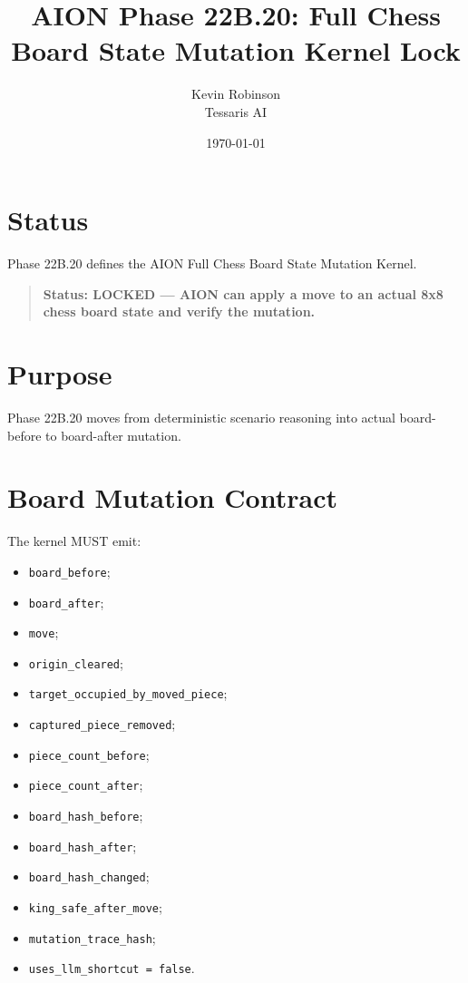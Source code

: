 \documentclass[11pt,a4paper]{article}
\title{\textbf{AION Phase 22B.20: Full Chess Board State Mutation Kernel Lock}}
\author{Kevin Robinson\\Tessaris AI}
\date{\today}
\begin{document}
\maketitle

\section{Status}

Phase 22B.20 defines the AION Full Chess Board State Mutation Kernel.

\begin{quote}
\textbf{Status: LOCKED --- AION can apply a move to an actual 8x8 chess board state and verify the mutation.}
\end{quote}

\section{Purpose}

Phase 22B.20 moves from deterministic scenario reasoning into actual board-before to board-after mutation.

\section{Board Mutation Contract}

The kernel MUST emit:

\begin{itemize}
  \item \texttt{board\_before};
  \item \texttt{board\_after};
  \item \texttt{move};
  \item \texttt{origin\_cleared};
  \item \texttt{target\_occupied\_by\_moved\_piece};
  \item \texttt{captured\_piece\_removed};
  \item \texttt{piece\_count\_before};
  \item \texttt{piece\_count\_after};
  \item \texttt{board\_hash\_before};
  \item \texttt{board\_hash\_after};
  \item \texttt{board\_hash\_changed};
  \item \texttt{king\_safe\_after\_move};
  \item \texttt{mutation\_trace\_hash};
  \item \texttt{uses\_llm\_shortcut = false}.
\end{itemize}
\end{document}
